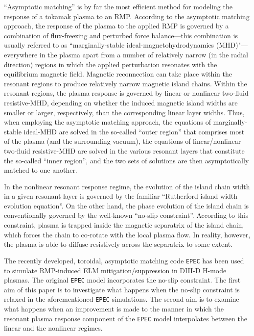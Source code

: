 \documentclass[12pt,prb,aps]{revtex4-1}
\begin{document}
``Asymptotic matching'' is by far the most efficient method for modeling the response of a tokamak plasma to an RMP.\cite{fkr,rfa, am1,am2,am3} 
According to the asymptotic matching approach, the response of the plasma to the applied RMP is governed by a combination of flux-freezing and
perturbed force balance---this combination is usually referred to as ``marginally-stable ideal-magnetohydrodynamics (MHD)"---everywhere in the plasma apart from a number of relatively narrow (in the radial direction) regions in which the applied
perturbation resonates with the equilibrium magnetic field. Magnetic reconnection can take place within the resonant regions to
produce relatively narrow magnetic island chains. Within the resonant regions, the plasma response is governed by  linear or nonlinear 
 two-fluid resistive-MHD, depending on whether the induced magnetic island widths are smaller or larger, respectively, than the corresponding linear layer widths. 
 Thus, when employing the asymptotic matching approach, the equations of marginally-stable ideal-MHD
are solved in the so-called ``outer region'' that comprises most of the plasma (and the surrounding vacuum), the equations of 
linear/nonlinear two-fluid resistive-MHD are solved in the various resonant layers that constitute the so-called ``inner region'', and the two
sets of solutions are then asymptotically matched to one another. 

In the nonlinear resonant response regime, the evolution of the island chain width in a given resonant layer is governed by the familiar ``Rutherford island width evolution equation''.\cite{ruth,ruth1}
On the other hand, the phase evolution of the island chain is conventionally governed by the well-known ``no-slip constraint''.\cite{rfa} According to this constraint,  plasma is trapped inside the
magnetic separatrix of the island chain,
which forces the chain to co-rotate with the local plasma flow. In reality, however, the plasma
is able to diffuse resistively across the separatrix to some extent.\cite{slip1,slip2} 

The recently developed, toroidal, asymptotic matching code {\tt EPEC} has been used to simulate 
RMP-induced ELM mitigation/suppression in DIII-D H-mode plasmas.\cite{rftor,rftor1}
The original {\tt EPEC} model incorporates the no-slip constraint.
The first aim of this paper is to investigate 
what happens when the no-slip constraint is relaxed in the aforementioned {\tt EPEC} simulations.
 The second aim is to examine what happens when an improvement is made to the manner in which the resonant
plasma response component of the {\tt EPEC} model interpolates between the linear and the nonlinear regimes. 
\end{document}

